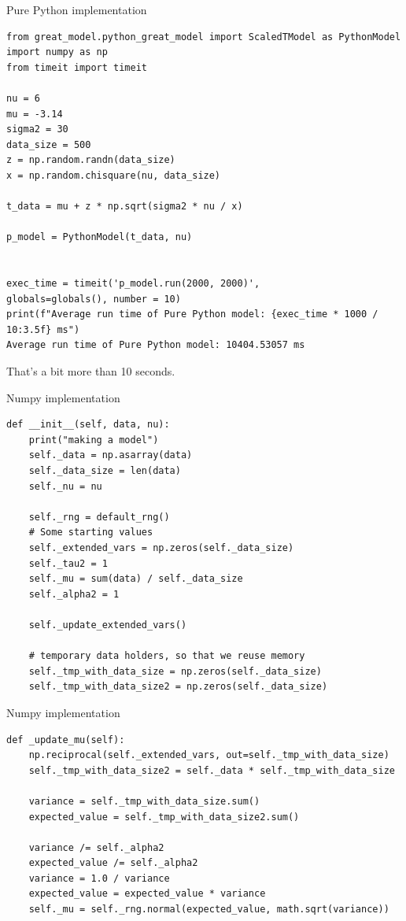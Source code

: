 \documentclass[8pt]{beamer}
\begin{document}
\begin{frame}[fragile]{Pure Python implementation}
\begin{verbatim}
from great_model.python_great_model import ScaledTModel as PythonModel
import numpy as np
from timeit import timeit

nu = 6
mu = -3.14
sigma2 = 30
data_size = 500
z = np.random.randn(data_size)
x = np.random.chisquare(nu, data_size)

t_data = mu + z * np.sqrt(sigma2 * nu / x)

p_model = PythonModel(t_data, nu)


exec_time = timeit('p_model.run(2000, 2000)', 
globals=globals(), number = 10)
print(f"Average run time of Pure Python model: {exec_time * 1000 / 10:3.5f} ms")
Average run time of Pure Python model: 10404.53057 ms
\end{verbatim}
That's a bit more than 10 seconds.  
\end{frame}

\begin{frame}[fragile]{Numpy implementation}
\begin{verbatim}
def __init__(self, data, nu):
	print("making a model")
	self._data = np.asarray(data)
	self._data_size = len(data)
	self._nu = nu

	self._rng = default_rng()
	# Some starting values
	self._extended_vars = np.zeros(self._data_size)
	self._tau2 = 1
	self._mu = sum(data) / self._data_size
	self._alpha2 = 1

	self._update_extended_vars()
	
	# temporary data holders, so that we reuse memory
	self._tmp_with_data_size = np.zeros(self._data_size)
	self._tmp_with_data_size2 = np.zeros(self._data_size)
\end{verbatim}
\end{frame}

\begin{frame}[fragile]{Numpy implementation}
\begin{verbatim}
def _update_mu(self):
	np.reciprocal(self._extended_vars, out=self._tmp_with_data_size)
	self._tmp_with_data_size2 = self._data * self._tmp_with_data_size

	variance = self._tmp_with_data_size.sum()
	expected_value = self._tmp_with_data_size2.sum()

	variance /= self._alpha2
	expected_value /= self._alpha2
	variance = 1.0 / variance
	expected_value = expected_value * variance
	self._mu = self._rng.normal(expected_value, math.sqrt(variance))
\end{verbatim}
\end{frame}
\end{document}
